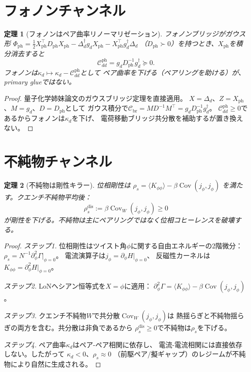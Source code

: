 \documentclass[12pt]{article}
\theoremstyle{plain}
\newtheorem{theorem}{定理}[section]
\theoremstyle{definition}
\numberwithin{equation}{section}
\newcommand{\br}{\mathrm{br}}
\DeclareMathOperator{\Cov}{Cov}
\begin{document}
\section{フォノンチャンネル}\label{sec:phonon}

\begin{theorem}[フォノンはペア曲率リノーマリゼーション]\label{thm:phonon}
フォノンブリッジがガウス形
$\Phi_{\mathrm{ph}}=\frac{1}{2}X_{\mathrm{ph}}^\top D_{\mathrm{ph}}X_{\mathrm{ph}}
-\Delta_d^\dagger g_d X_{\mathrm{ph}}-X_{\mathrm{ph}}^\top g_d^\dagger\Delta_d$
（$D_{\mathrm{ph}}\succ 0$）を持つとき、$X_{\mathrm{ph}}$を積分消去すると
\begin{equation}
\boxed{\mathcal{C}_{dd}^{\mathrm{ph}}
=g_d D_{\mathrm{ph}}^{-1}g_d^\dagger\succeq 0.}
\end{equation}
フォノンは$\kappa_d\mapsto\kappa_d-\mathcal{C}_{dd}^{\mathrm{ph}}$として
ペア曲率を下げる（ペアリングを助ける）が、primary glueではない。
\end{theorem}

\begin{proof}
量子化学姉妹論文のガウスブリッジ定理を直接適用。
$X=\Delta_d$、$Z=X_{\mathrm{ph}}$、$M=g_d$、$D=D_{\mathrm{ph}}$として
ガウス積分で$\mathcal{C}_{\br}=MD^{-1}M^\top=g_dD_{\mathrm{ph}}^{-1}g_d^\dagger$。
$\mathcal{C}_{dd}^{\mathrm{ph}}\geq 0$であるからフォノンは$\kappa_d$を下げ、
電荷移動ブリッジ共分散を補助するが置き換えない。
\end{proof}


\section{不純物チャンネル}\label{sec:disorder}

\begin{theorem}[不純物は剛性キラー]\label{thm:disorder}
位相剛性は
$\rho_s=\langle K_{\phi\phi}\rangle-\beta\Cov(j_\phi,j_\phi)$
を満たす。クエンチ不純物平均後：
\begin{equation}
\boxed{\rho_s^{\mathrm{dis}}
:=\beta\Cov_W(j_\phi,j_\phi)\geq 0}
\end{equation}
が剛性を下げる。不純物は主にペアリングではなく位相コヒーレンスを破壊する。
\end{theorem}

\begin{proof}
\emph{ステップ1.}
位相剛性はツイスト角$\phi$に関する自由エネルギーの2階微分：
$\rho_s=N^{-1}\partial_\phi^2\Gamma|_{\phi=0}$。
電流演算子は$j_\phi=\partial_\phi H|_{\phi=0}$、
反磁性カーネルは$K_{\phi\phi}=\partial_\phi^2 H|_{\phi=0}$。

\emph{ステップ2.}
LoNヘシアン恒等式を$X=\phi$に適用：
$\partial_\phi^2\Gamma=\langle K_{\phi\phi}\rangle
-\beta\Cov(j_\phi,j_\phi)$。

\emph{ステップ3.}
クエンチ不純物$W$で共分散$\Cov_W(j_\phi,j_\phi)$は
熱揺らぎと不純物揺らぎの両方を含む。共分散は非負であるから
$\rho_s^{\mathrm{dis}}\geq 0$で不純物は$\rho_s$を下げる。

\emph{ステップ4.}
ペア曲率$\kappa_d$はペア-ペア相関に依存し、
電流-電流相関には直接依存しない。したがって
$\kappa_d<0$、$\rho_s\approx 0$
（前駆ペア/擬ギャップ）のレジームが不純物により自然に生成される。
\end{proof}
\end{document}
